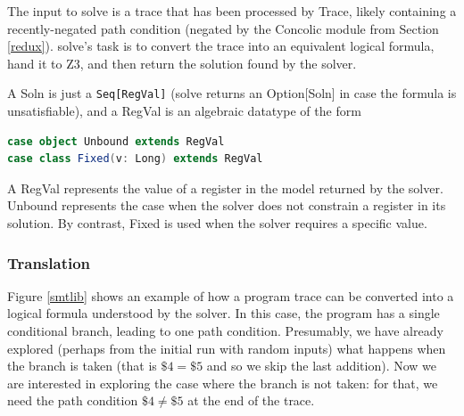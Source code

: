 \documentclass{llncs}
\begin{document}
The input to \textsf{solve} is a trace that has been processed by \textsf{Trace}, likely containing a recently-negated path condition (negated by the \textsf{Concolic} module from Section \ref{redux}). \textsf{solve}'s task is to convert the trace into an equivalent logical formula, hand it to \textsf{Z3}, and then return the solution found by the solver.

A \textsf{Soln} is just a \lstinline{Seq[RegVal]} (\textsf{solve} returns an \textsf{Option[Soln] in case the formula is unsatisfiable}), and a \textsf{RegVal} is an algebraic datatype of the form

\begin{lstlisting}[language=scala]
case object Unbound extends RegVal
case class Fixed(v: Long) extends RegVal
\end{lstlisting}

A \textsf{RegVal} represents the value of a register in the model returned by the solver. \textsf{Unbound} represents the case when the solver does not constrain a register in its solution. By contrast, \textsf{Fixed} is used when the solver requires a specific value.

\subsubsection{Translation}

Figure \ref{smtlib} shows an example of how a program trace can be converted into a logical formula understood by the solver. In this case, the program has a single conditional branch, leading to one path condition. Presumably, we have already explored (perhaps from the initial run with random inputs) what happens when the branch is taken (that is $\$4 = \$5$ and so we skip the last addition). Now we are interested in exploring the case where the branch is not taken: for that, we need the path condition $\$4 \neq \$5$ at the end of the trace.
\end{document}
